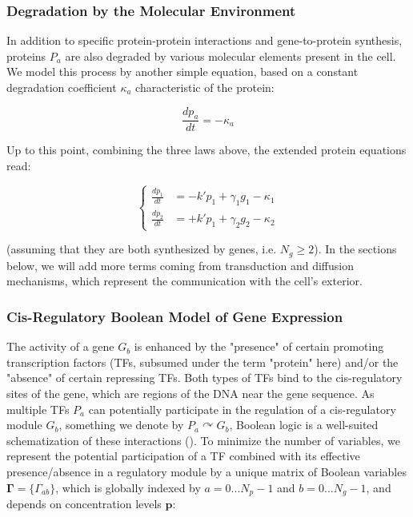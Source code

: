 \subsubsection{Degradation by the Molecular Environment}


In addition to specific protein-protein interactions and gene-to-protein synthesis, proteins $P_a$ are also degraded by various molecular elements present in the cell. We model this process by another simple equation, based on a constant degradation coefficient $\kappa_a$ characteristic of the protein:

$$\frac{dp_a}{dt} = -\kappa_a$$

Up to this point, combining the three laws above, the extended protein equations read:

$$\begin{cases}        \frac{dp_1}{dt} & = -k' p_1 + \gamma_1 g_1 - \kappa_1 \\[.5em]        \frac{dp_2}{dt} & = +k' p_1 + \gamma_2 g_2 - \kappa_2      \end{cases}$$

(assuming that they are both synthesized by genes, i.e. $N_g \geq 2$). In the sections below, we will add more terms coming from transduction and diffusion mechanisms, which represent the communication with the cell's exterior.  


\subsubsection{Cis-Regulatory Boolean Model of Gene Expression}


The activity of a gene $G_b$ is enhanced by the "presence" of certain promoting transcription factors (TFs, subsumed under the term "protein" here) and/or the "absence" of certain repressing TFs. Both types of TFs bind to the cis-regulatory sites of the gene, which are regions of the DNA near the gene sequence. As multiple TFs $P_a$ can potentially participate in the regulation of a cis-regulatory module $G_b$, something we denote by $P_a \curvearrowright G_b$, Boolean logic is a well-suited schematization of these interactions (\cite{Peter:2012dy}). To minimize the number of variables, we represent the potential participation of a TF combined with its effective presence/absence in a regulatory module by a unique matrix of Boolean variables $\mathbf{\Gamma}=\{\Gamma_{ab}\}$, which is globally indexed by $a=0...N_p\!-\!1$ and $b=0...N_g\!-\!1$, and depends on concentration levels $\mathbf{p}$:

